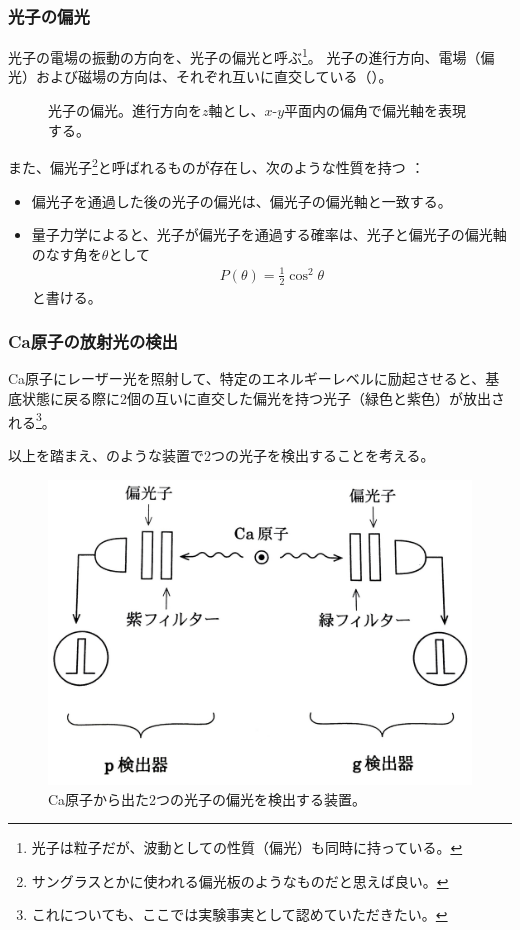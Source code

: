 \documentclass[10pt,b5paper,papersize,dvipdfmx]{jsbook}
\begin{document}
%
\subsubsection{光子の偏光} %

光子の電場の振動の方向を、光子の偏光と呼ぶ\footnote{
  光子は粒子だが、波動としての性質（偏光）も同時に持っている。
}。
光子の進行方向、電場（偏光）および磁場の方向は、それぞれ互いに直交している（）。

\begin{figure}[ht]
  \centering
  
  \caption{光子の偏光。進行方向を$z$軸とし、$x$-$y$平面内の偏角で偏光軸を表現する。}
  \label{fig:photon-henkou}
\end{figure}

\par
また、偏光子\footnote{
  サングラスとかに使われる偏光板のようなものだと思えば良い。
}と呼ばれるものが存在し、次のような性質を持つ
：
\begin{itemize}
  \item 偏光子を通過した後の光子の偏光は、偏光子の偏光軸と一致する。
  \item 量子力学によると、光子が偏光子を通過する確率は、光子と偏光子の偏光軸のなす角を$\theta$として
    \begin{align}
      P(\theta) = \frac12 \cos^2\theta
      \label{eq:P(theta)}
    \end{align}
    と書ける。
\end{itemize}

%
\subsubsection{Ca原子の放射光の検出} %

Ca原子にレーザー光を照射して、特定のエネルギーレベルに励起させると、基底状態に戻る際に2個の互いに直交した偏光を持つ光子（緑色と紫色）が放出される\footnote{
  これについても、ここでは実験事実として認めていただきたい。
}。\par
以上を踏まえ、のような装置で2つの光子を検出することを考える。

\begin{figure}[htb]
  \centering
  \includegraphics[width=.5\textwidth]{nkym/fig/souchi.jpeg}
  \caption{Ca原子から出た2つの光子の偏光を検出する装置。} %
  \label{fig:Ca-machine}
\end{figure}
\end{document}
